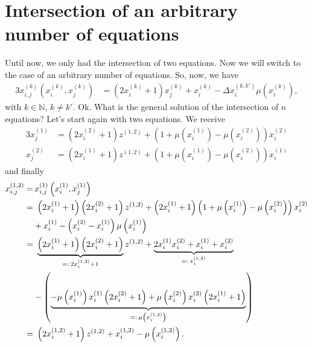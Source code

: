 \section{Intersection of an arbitrary number of equations}
\label{s:intarbitrarynumbeqs}
Until now, we only had the intersection of two equations. Now we will switch to the case of an arbitrary number of equations. So, now, we have
\begin{alignat}{3}
	x_{i,j}^{\left(k\right)}\left(x_{i}^{\left(k\right)}, x_{j}^{\left(k\right)}\right) &= \left(2x_{i}^{\left(k\right)} + 1\right)x_{j}^{\left(k\right)} + x_{i}^{\left(k\right)} - \Delta x_{i}^{\left(k,k\prime\right)}\mu\left(x_{i}^{\left(k\right)}\right), \label{eq:intarbnumb_geneq}
\end{alignat}
with $k \in \mathbb{N}$, $k \neq k\prime$. Ok. What is the general solution of the intersection of $n$ equations? Let's start again with two equations. We receive
\begin{alignat}{3}
	x_{j}^{\left(1\right)} &= \left(2x_{i}^{\left(2\right)} + 1\right)z^{\left(1,2\right)} + \left(1 + \mu\left(x_{i}^{\left(1\right)}\right) - \mu\left(x_{i}^{\left(2\right)}\right)\right)x_{i}^{\left(2\right)} \label{eq:step1_sol_xj1} \\
	x_{j}^{\left(2\right)} &= \left(2x_{i}^{\left(1\right)} + 1\right)z^{\left(1,2\right)} + \left(1 + \mu\left(x_{i}^{\left(1\right)}\right) - \mu\left(x_{i}^{\left(2\right)}\right)\right)x_{i}^{\left(1\right)} \label{eq:step1_sol_xj2}
\end{alignat}
and finally
\begin{alignat}{3}
	x_{i,j}^{\left(1,2\right)} =& \, x_{i,j}^{\left(1\right)}\left(x_{i}^{\left(1\right)},x_{j}^{\left(1\right)}\right) \notag \\
	=& \ \left(2x_{i}^{\left(1\right)} + 1\right)\left(2x_{i}^{\left(2\right)} + 1\right)z^{\left(1,2\right)}
	+ \left(2x_{i}^{\left(1\right)} + 1\right)\left(1 + \mu\left(x_{i}^{\left(1\right)}\right) - \mu\left(x_{i}^{\left(2\right)}\right)\right)x_{i}^{\left(2\right)} \notag \\  
	&+ x_{i}^{\left(1\right)} - \left(x_{i}^{\left(2\right)} - x_{i}^{\left(1\right)}\right)\mu\left(x_{i}^{\left(1\right)}\right) \notag \\
	=& \ \underbrace{\left(2x_{i}^{\left(1\right)} + 1\right)\left(2x_{i}^{\left(2\right)} + 1\right)}_{=: \, 2x_{i}^{\left(1,2\right)} + 1}z^{\left(1,2\right)}
	+ \underbrace{2x_{i}^{\left(1\right)}x_{i}^{\left(2\right)} + x_{i}^{\left(1\right)} + x_{i}^{\left(2\right)}}_{=: \, x_{i}^{\left(1,2\right)}} \notag \\
	&- \left(\underbrace{-\mu\left(x_{i}^{\left(1\right)}\right)x_{i}^{\left(1\right)}\left(2x_{i}^{\left(2\right)} + 1\right)
	+ \mu\left(x_{i}^{\left(2\right)}\right)x_{i}^{\left(2\right)}\left(2x_{i}^{\left(1\right)} + 1\right)}_{=: \, \mu\left(x_{i}^{\left(1,2\right)}\right)}\right) \notag \\
	=& \ \left(2x_{i}^{\left(1,2\right)} + 1\right)z^{\left(1,2\right)} + x_{i}^{\left(1,2\right)} - \mu\left(x_{i}^{\left(1,2\right)}\right). \label{eq:step1_sol_xij12}
\end{alignat}

